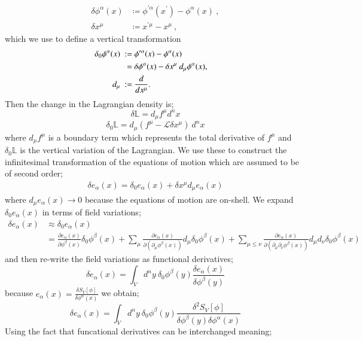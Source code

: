 \documentclass{article}
\begin{document}
\begin{align*}
	\delta \phi^\alpha(x) &\coloneqq \phi^{\prime \alpha}(x^\prime) - \phi^\alpha (x)\ , \\
	\delta x^\mu & \coloneqq x^{\prime \mu} - x^\mu \ ,
\end{align*}
which we use to define a vertical transformation%
\begin{align}
	\delta_0 \phi^{\alpha}(x)~:=~&\phi^{\prime \alpha}(x)-\phi^{\alpha}(x)\cr
~=~&\delta \phi^{\alpha}(x)-\delta x^{\mu} ~d_{\mu}\phi^{\alpha}(x),\cr
d_{\mu}~:=~&\frac{d}{dx^{\mu}}.
\end{align}
Then the change in the Lagrangian density is;
\[
	\delta \mathbb{L} = d_\mu f^\mu d^nx
\]
\[
	\delta_0 \mathbb{L} = d_\mu \left(f^\mu - \mathcal{L}\delta x^\mu\right)\ d^nx
\]
where $d_\mu f^\mu$ is a boundary term which represents the total derivative of $f^\mu$ and $\delta_0 \mathbb{L}$ is the vertical variation of the Lagrangian. We use these to construct the infinitesimal transformation of the equations of motion which are assumed to be of second order;
\begin{align*}
	\delta e_\alpha(x) = \delta_0 e_\alpha(x) + \delta x^\mu d_\mu e_\alpha(x)
\end{align*}
where $d_\mu e_\alpha(x) \to 0$ because the equations of motion are on-shell. We expand $\delta_0 e_\alpha(x)$ in terms of field variations;
\begin{align*}
	\delta e_\alpha(x) &\approx \delta_0 e_\alpha(x) \\
	&= \frac{\partial e_{\alpha}(x)}{\partial\phi^{\beta}(x)}\delta_0\phi^{\beta}(x) +\sum_{\mu}\frac{\partial e_{\alpha}(x)}{\partial(\partial_{\mu}\phi^{\beta}(x))}d_{\mu}\delta_0\phi^{\beta}(x) +\sum_{\mu\leq \nu }\frac{\partial e_{\alpha}(x)}{\partial(\partial_{\mu}\partial_{\nu}\phi^{\beta}(x))}d_{\mu}d_{\nu}\delta_0\phi^{\beta}(x)
\end{align*}
and then re-write the field variations as functional derivatives;
\[
	\delta e_\alpha(x) = \int_V\! d^ny~ \delta_0\phi^{\beta}(y)\frac{\delta e_{\alpha}(x)}{\delta \phi^{\beta}(y)}
\]
because $e_\alpha(x) = \frac{\delta S_V\left[\phi\right]}{\delta \phi^\alpha(x)}$ we obtain;
\[
	\delta e_\alpha(x) = \int_V\! d^ny~ \delta_0\phi^{\beta}(y)\frac{\delta^2 S_V[\phi]}{\delta \phi^{\beta}(y)\delta \phi^{\alpha}(x)}
\]
Using the fact that funcational derivatives can be interchanged meaning;
\end{document}
